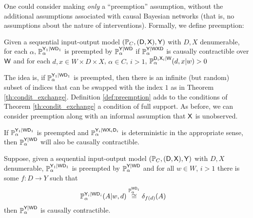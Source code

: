 One could consider making \emph{only} a ``preemption'' assumption, without the additional assumptions associated with causal Bayesian networks (that is, no assumptions about the nature of interventions). Formally, we define preemption:
\begin{definition}[Preemption]\label{def:preemption}
Given a sequential input-output model $(\mathbb{P}_C, (\mathsf{D},\mathsf{X}), \mathsf{Y})$ with $D,X$ denumerable, for each $\alpha$, $\mathbb{P}_\alpha^{\mathsf{Y}_1|\mathsf{WD}_1}$ is preempted by $\mathbb{P}_\alpha^{\mathsf{Y}|\mathsf{WD}}$ if $\mathbb{P}_\alpha^{\mathsf{Y}|\mathsf{WXD}}$ is causally contractible over $\mathsf{W}$ and for each $d,x\in W\times D\times X$, $\alpha\in C$, $i>1$, $\mathbb{P}_\alpha^{\mathsf{D}_i\mathsf{X}_i|\mathsf{W}}(d,x|w)>0$
\end{definition}

The idea is, if $\mathbb{P}_\alpha^{\mathsf{Y}_1|\mathsf{WD}_1}$ is preempted, then there is an infinite (but random) subset of indices that can be swapped with the index $1$ as in Theorem \ref{th:condit_exchange}. Definition \ref{def:preemption} adds to the conditions of Theorem \ref{th:condit_exchange} a condition of full support. As before, we can consider preemption along with an informal assumption that $\mathsf{X}$ is unobserved.

If $\mathbb{P}_\alpha^{\mathsf{Y}_1|\mathsf{WD}_1}$ is preempted and $\mathbb{P}_\alpha^{\mathsf{Y}_i|\mathsf{W}\mathsf{X}_i\mathsf{D}_i}$ is deterministic in the appropriate sense, then $\mathbb{P}_\alpha^{\mathsf{Y}|\mathsf{WD}}$ will also be causally contractible. 

\begin{theorem}\label{th:det_obs_to_cons}
Suppose, given a sequential input-output model $(\mathbb{P}_C, (\mathsf{D},\mathsf{X}), \mathsf{Y})$ with $D,X$ denumerable, $\mathbb{P}_\alpha^{\mathsf{Y}_1|\mathsf{WD}_1}$ is preempted by $\mathbb{P}_\alpha^{\mathsf{Y}|\mathsf{WD}}$ and for all $w\in W$, $i>1$ there is some $f:D\to Y$ such that
\begin{align}
    \mathbb{P}_\alpha^{\mathsf{Y}_i|\mathsf{W}\mathsf{D}_i}(A|w,d) &\overset{\mathbb{P}_\alpha^{\mathsf{WD}_i}}{\cong} \delta_{f(d)}(A)
\end{align}
then $\mathbb{P}_\alpha^{\mathsf{Y}|\mathsf{WD}}$ is causally contractible.
\end{theorem}

